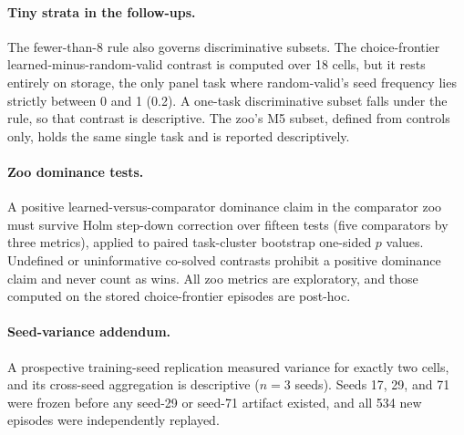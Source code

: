 \paragraph{Tiny strata in the follow-ups.}
The fewer-than-8 rule also governs discriminative subsets. The choice-frontier learned-minus-random-valid contrast is computed over 18 cells, but it rests entirely on storage, the only panel task where random-valid's seed frequency lies strictly between 0 and 1 (0.2). A one-task discriminative subset falls under the rule, so that contrast is descriptive. The zoo's M5 subset, defined from controls only, holds the same single task and is reported descriptively.

\paragraph{Zoo dominance tests.}
A positive learned-versus-comparator dominance claim in the comparator zoo must survive Holm step-down correction over fifteen tests (five comparators by three metrics), applied to paired task-cluster bootstrap one-sided $p$ values. Undefined or uninformative co-solved contrasts prohibit a positive dominance claim and never count as wins. All zoo metrics are exploratory, and those computed on the stored choice-frontier episodes are post-hoc.

\paragraph{Seed-variance addendum.}
A prospective training-seed replication measured variance for exactly two cells, and its cross-seed aggregation is descriptive ($n = 3$ seeds). Seeds 17, 29, and 71 were frozen before any seed-29 or seed-71 artifact existed, and all 534 new episodes were independently replayed.

